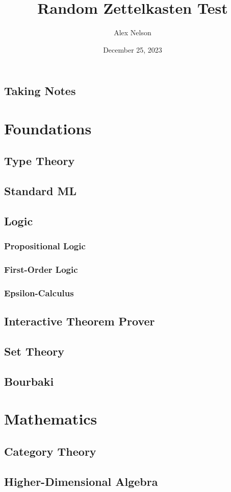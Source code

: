 \documentclass[dvipsnames,HTML]{amsbook}
\title{Random Zettelkasten Test}
\author{Alex Nelson}
\date{December 25, 2023}
\begin{document}
\frontmatter
\maketitle
\tableofcontents
\mainmatter
\vfill\eject
\chapter{Taking Notes}


\part{Foundations}
\chapter{Type Theory}


\chapter{Standard ML}


\chapter{Logic}
\section{Propositional Logic}

\section{First-Order Logic}

\section{Epsilon-Calculus}


\chapter{Interactive Theorem Prover}


\chapter{Set Theory}

% 

\chapter{Bourbaki}


\part{Mathematics}

\chapter{Category Theory}

\chapter{Higher-Dimensional Algebra}


\backmatter
\nocite{*}

\end{document}
